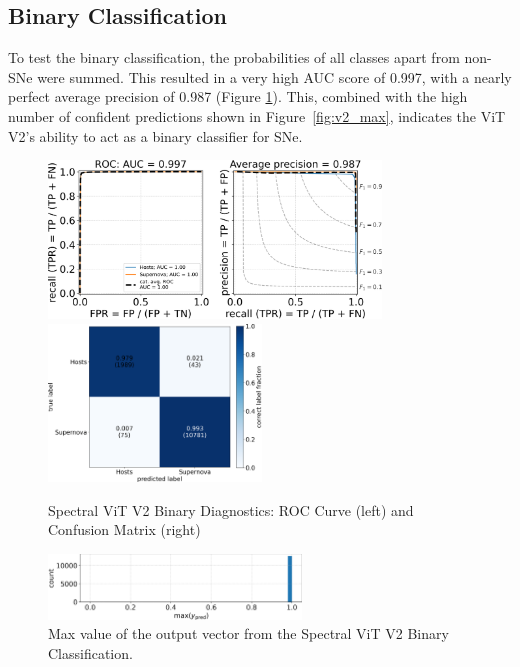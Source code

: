 \subsection{Binary Classification}
To test the binary classification, the probabilities of all classes apart from 
non-SNe were summed. This resulted in a very high AUC score of 0.997, with a 
nearly perfect average precision of 0.987 (Figure \ref{fig:v2_binary_qual}).
This, combined with the high number of confident predictions shown in 
Figure~\ref{fig:v2_max}, indicates the ViT V2's ability to act as a binary 
classifier for SNe.
\begin{figure}[t]
    \centering
    \includegraphics[height=4.2cm]{figures/v2_real/vit_model_V2rocfull_binary_e26.png}
    \quad
    \includegraphics[height=4.2cm]{figures/v2_real/vit_model_V2cmfull_binary_e26.png}
    \caption{Spectral ViT V2 Binary Diagnostics: ROC Curve (left) and Confusion Matrix (right)\label{fig:v2_binary_qual}}
\end{figure}

\begin{figure}[h]
    \centering
    \includegraphics[width=0.6\textwidth]{figures/v2_real/vit_model_V2max_ypred_binary_26.png}
    \caption{Max value of the output vector from the Spectral ViT V2 Binary Classification.\label{fig:fig:v2_binary_pred}}
\end{figure}


